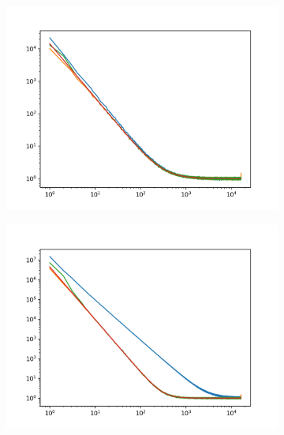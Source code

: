 \documentclass[12]{article}
\begin{document}
\begin{figure}
    \centering
    \begin{subfigure}[t]{0.45\textwidth}
        \centering
        \includegraphics[width=\linewidth]{plots/power_spectra_5_3.png}
    \end{subfigure}
    \hfill
    \begin{subfigure}[t]{0.45\textwidth}
        \centering
        \includegraphics[width=\linewidth]{plots/power_spectra_8_3.png}
    \end{subfigure}


\end{figure}
\end{document}
